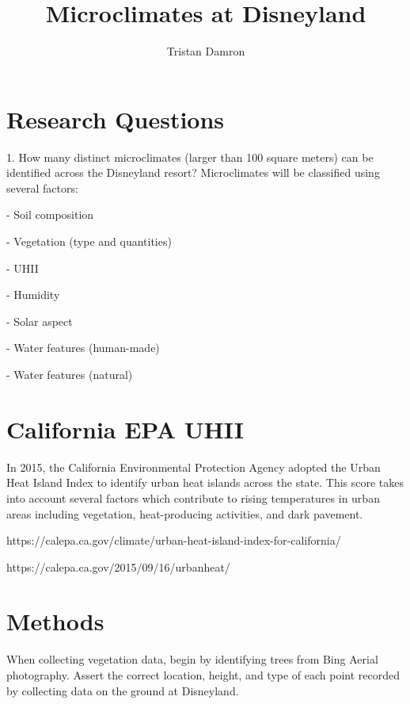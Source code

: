 \documentclass[11pt]{article}
\title{\textbf{Microclimates at Disneyland}}
\author{Tristan Damron}
\date{}
\begin{document}
\maketitle

\section{Research Questions}

1. How many distinct microclimates (larger than 100 square meters) can be identified across the Disneyland resort? Microclimates will be classified using several factors:

- Soil composition

- Vegetation (type and quantities)

- UHII

- Humidity

- Solar aspect
 
- Water features (human-made)

- Water features (natural)


\section{California EPA UHII}

In 2015, the California Environmental Protection Agency adopted the Urban Heat Island Index to identify urban heat islands across the state. This score takes into account several factors which contribute to rising temperatures in urban areas including vegetation, heat-producing activities, and dark pavement. 


https://calepa.ca.gov/climate/urban-heat-island-index-for-california/


https://calepa.ca.gov/2015/09/16/urbanheat/


\section{Methods}

When collecting vegetation data, begin by identifying trees from Bing Aerial photography. Assert the correct location, height, and type of each point recorded by collecting data on the ground at Disneyland.
\end{document}
